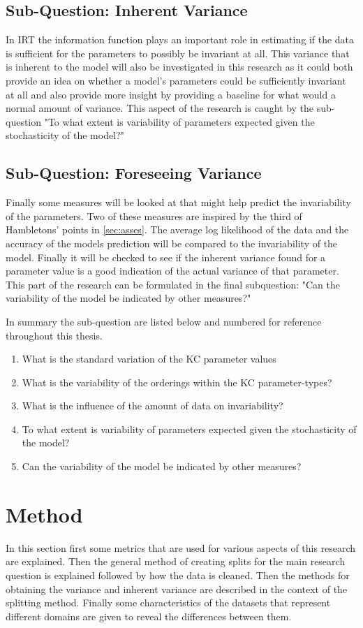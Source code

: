 \documentclass{scrartcl}
\begin{document}
\subsection{Sub-Question: Inherent Variance}
In IRT the information function plays an important role in estimating if the data is sufficient for the parameters to possibly be invariant at all. This variance that is inherent to the model will also be investigated in this research as it could both provide an idea on whether a model's parameters could be sufficiently invariant at all and also provide more insight by providing a baseline for what would a normal amount of variance. This aspect of the research is caught by the sub-question "To what extent is variability of parameters expected given the stochasticity of the model?"

\subsection{Sub-Question: Foreseeing Variance}
Finally some measures will be looked at that might help predict the invariability of the parameters. Two of these measures are inspired by the third of Hambletons' points in \ref{sec:asses}. The average log likelihood of the data and the accuracy of the models prediction will be compared to the invariability of the model. Finally it will be checked to see if the inherent variance found for a parameter value is a good indication of the actual variance of that parameter. This part of the research can be formulated in the final subquestion: "Can the variability of the model be indicated by other measures?"

In summary the sub-question are listed below and numbered for reference throughout this thesis.
\begin{enumerate}
  \item What is the standard variation of the KC parameter values
  \item What is the variability of the orderings within the KC parameter-types?
  \item What is the influence of the amount of data on invariability?
  \item To what extent is variability of parameters expected given the stochasticity of the model?
  \item Can the variability of the model be indicated by other measures?
\end{enumerate}

\section{Method}
In this section first some metrics that are used for various aspects of this research are explained. Then the general method of creating splits for the main research question is explained followed by how the data is cleaned. Then the methods for obtaining the variance and inherent variance are described in the context of the splitting method. Finally some characteristics of the datasets that represent different domains are given to reveal the differences between them.
\end{document}
